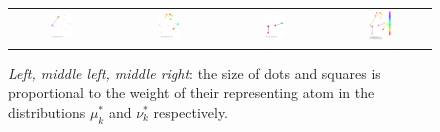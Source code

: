 \begin{figure}[h!]
\begin{tabular}{@{}c@{}c@{}c@{}c@{}}
\includegraphics[width=0.23\textwidth]{sections/appendix/aistats2021_eot/figures/dual_MOT_1_norm.pdf}&
\includegraphics[width=0.23\textwidth]{sections/appendix/aistats2021_eot/figures/dual_MOT_2_norm.pdf}&
\includegraphics[width=0.23\textwidth]{sections/appendix/aistats2021_eot/figures/dual_MOT_3_norm.pdf}&
\includegraphics[width=0.268\textwidth]{sections/appendix/aistats2021_eot/figures/dual_MOT_1_2_3_norm.pdf}
\end{tabular}
\caption{\emph{Left, middle left, middle right}: the size of dots and squares is proportional to the weight of their representing atom in the distributions $\mu_k^{*}$ and $\nu_k^{*}$ respectively. %
}
\end{figure}
